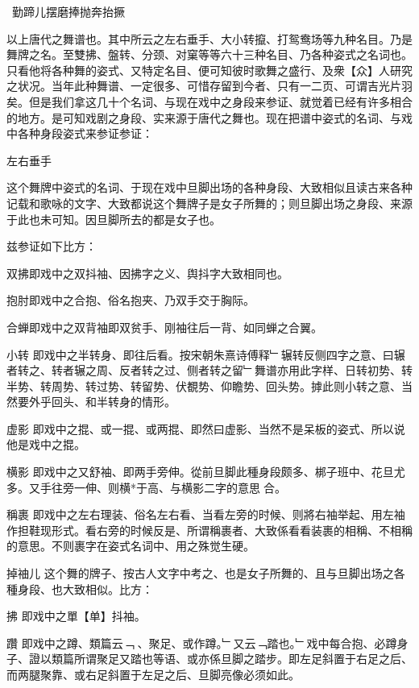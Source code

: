 ~勤蹄儿\quad  摆\quad  磨\quad  捧\quad  抛\quad  奔\quad  抬\quad  撅

以上唐代之舞谱也。其中所云之左右垂手、大小转攛、打鸳鸯场等九种名目。乃是舞牌之名。至雙拂、盤转、分颈、对窠等等六十三种名目、乃各种姿式之名词也。只看他将各种舞的姿式、又特定名目、便可知彼时歌舞之盛行、及衆【众】人研究之状况。当年此种舞谱、一定很多、可惜存留到今者、只有一二页、可谓吉光片羽矣。但是我们拿这几十个名词、与现在戏中之身段来参证、就觉着已经有许多相合的地方。是可知戏剧之身段、实来源于唐代之舞也。现在把谱中姿式的名词、与戏中各种身段姿式来参证参证：

\quad 左右垂手\quad 

这个舞牌中姿式的名词、于现在戏中旦脚出场的各种身段、大致相似且读古来各种记载和歌咏的文字、大致都说这个舞牌子是女子所舞的；则旦脚出场之身段、来源于此也未可知。因旦脚所去的都是女子也。

兹参证如下比方：

\quad 双拂\quad  即戏中之双抖袖、因拂字之义、舆抖字大致相同也。

\quad 抱肘\quad  即戏中之合抱、俗名抱夹、乃双手交于胸际。

\quad 合蝉\quad  即戏中之双背袖即双贫手、刚袖往后一背、如同蝉之合翼。

\quad 小转 \quad
即戏中之半转身、即往后看。按宋朝朱熹诗傅释﹂辗转反侧四字之意、曰辗者转之、转者辗之周、反者转之过、侧者转之留﹂舞谱亦用此字样、日转初势、转半势、转周势、转过势、转留势、伏覩势、仰瞻势、回头势。摢此则小转之意、当然要外乎回头、和半转身的情形。  

\quad 虚影
\quad 
即戏中之掍、或一掍、或两掍、即然曰虚影、当然不是呆板的姿式、所以说他是戏中之掍。

\quad 横影
\quad 即戏中之又舒袖、即两手旁伸。從前旦脚此種身段颇多、梆子班中、花旦尤多。又手往旁一伸、则横*于高、与横影二字的意思𣑕合。

\quad 稱裹
\quad 即戏中之左右理装、俗名左右看、当看左旁的时候、则將右袖举起、用左袖作担鞋现形式。看右旁的时候反是、所谓稱裹者、大致係看看装裹的相稱、不相稱的意思。不则裹字在姿式名词中、用之殊觉生硬。

\quad 掉䄂儿
\quad 这个舞的牌子、按古人文字中考之、也是女子所舞的、且与旦脚出场之各種身段、也大致相似。比方：

\quad 拂
\quad 即戏中之單【单】抖袖。

\quad 躦
\quad 即戏中之蹲、類篇云﹁𧿙、聚足、或作蹲。﹂又云﹁踏也。﹂戏中每合抱、必蹲身子、證以類篇所谓聚足又踏也等语、或亦係旦脚之踏步。即左足斜置于右足之后、而两腿聚靠、或右足斜置于左足之后、旦脚亮像必须如此。

